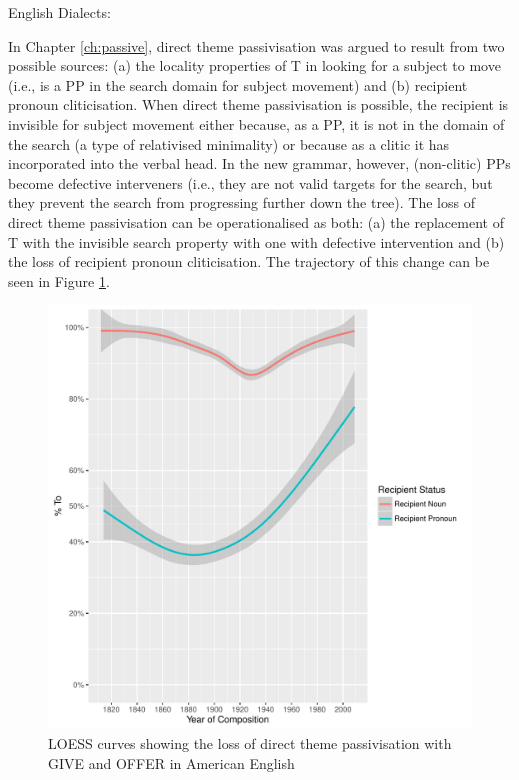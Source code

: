\begin{exe}
	 English Dialects:
		\begin{xlist}
		\end{xlist}
\end{exe}
	
	In Chapter \ref{ch:passive}, direct theme passivisation was argued to result from two possible sources: (a) the locality properties of T in looking for a subject to move (i.e., is a PP in the search domain for subject movement) and (b) recipient pronoun cliticisation. When direct theme passivisation is possible, the recipient is invisible for subject movement either because, as a PP, it is not in the domain of the search (a type of relativised minimality) or because as a clitic it has incorporated into the verbal head. In the new grammar, however, (non-clitic) PPs become defective interveners (i.e., they are not valid targets for the search, but they prevent the search from progressing further down the tree). The loss of direct theme passivisation can be operationalised as both: (a) the replacement of T with the invisible search property with one with defective intervention and (b) the loss of recipient pronoun cliticisation. The trajectory of this change can be seen in Figure \ref{fig:loss-of-dt-in-amen}.

	\begin{figure}[ht!]
		\includegraphics[width=\linewidth]{../images/directtheme-am}
		\caption{LOESS curves showing the loss of direct theme passivisation with GIVE and OFFER in American English}
		\label{fig:loss-of-dt-in-amen}
	\end{figure}

